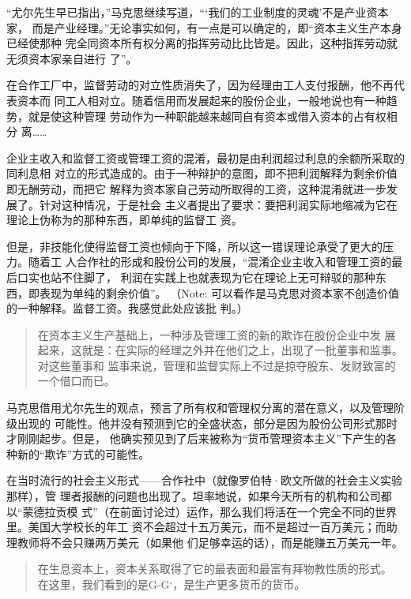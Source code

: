 “尤尔先生早已指出，”马克思继续写道，“‘我们的工业制度的灵魂’不是产业资本家，
而是产业经理。”无论事实如何，有一点是可以确定的，即“资本主义生产本身已经使那种
完全同资本所有权分离的指挥劳动比比皆是。因此，这种指挥劳动就无须资本家亲自进行
了”。

在合作工厂中，监督劳动的对立性质消失了，因为经理由工人支付报酬，他不再代表资本而
同工人相对立。随着信用而发展起来的股份企业，一般地说也有一种趋势，就是使这种管理
劳动作为一种职能越来越同自有资本或借入资本的占有权相分
离……

企业主收入和监督工资或管理工资的混淆，最初是由利润超过利息的余额所采取的同利息相
对立的形式造成的。由于一种辩护的意图，即不把利润解释为剩余价值即无酬劳动，而把它
解释为资本家自己劳动所取得的工资，这种混淆就进一步发展了。针对这种情况，于是社会
主义者提出了要求：要把利润实际地缩减为它在理论上伪称为的那种东西，即单纯的监督工
资。

但是，非技能化使得监督工资也倾向于下降，所以这一错误理论承受了更大的压力。随着工
人合作社的形成和股份公司的发展，“混淆企业主收入和管理工资的最后口实也站不住脚了，
利润在实践上也就表现为它在理论上无可辩驳的那种东西，即表现为单纯的剩余价值”。
（Note: 可以看作是马克思对资本家不创造价值的一种解释。监督工资。我感觉此处应该批
判。）

\begin{quotation}在资本主义生产基础上，一种涉及管理工资的新的欺诈在股份企业中发
展起来，这就是：在实际的经理之外并在他们之上，出现了一批董事和监事。对这些董事和
监事来说，管理和监督实际上不过是掠夺股东、发财致富的一个借口而已。

\end{quotation}

马克思借用尤尔先生的观点，预言了所有权和管理权分离的潜在意义，以及管理阶级出现的
可能性。他并没有预测到它的全盛状态，部分是因为股份公司形式那时才刚刚起步。但是，
他确实预见到了后来被称为“货币管理资本主义”下产生的各种新的“欺诈”方式的可能性。

在当时流行的社会主义形式——合作社中（就像罗伯特·欧文所做的社会主义实验那样），管
理者报酬的问题也出现了。坦率地说，如果今天所有的机构和公司都以“蒙德拉贡模
式”（在前面讨论过）运作，那么我们将活在一个完全不同的世界里。美国大学校长的年工
资不会超过十五万美元，而不是超过一百万美元；而助理教师将不会只赚两万美元（如果他
们足够幸运的话），而是能赚五万美元一年。

\begin{quotation}在生息资本上，资本关系取得了它的最表面和最富有拜物教性质的形式。
在这里，我们看到的是G-G`，是生产更多货币的货币。
\end{quotation}

